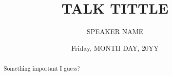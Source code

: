 \documentclass{UAmathtalk}
\author{SPEAKER NAME}
\title{TALK TITTLE}
\date{Friday, MONTH DAY, 20YY}
\begin{document}
\maketitle
\renewcommand*{\abstractsize}{\fontsize{13.5}{16.2}\selectfont}
\begin{abstract}
    {
        Something important I guess?
    }
\end{abstract}
\end{document}
